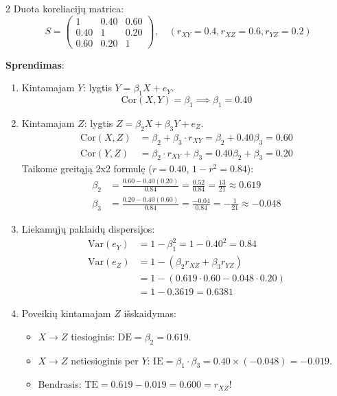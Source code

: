 \documentclass[9pt,a4paper]{article}
\begin{document}
\begin{multicols*}{2}
Duota koreliacijų matrica:
\begin{equation*}
    S = \begin{pmatrix} 1 & 0.40 & 0.60 \\ 0.40 & 1 & 0.20 \\ 0.60 & 0.20 & 1 \end{pmatrix}, \quad (r_{XY}=0.4, r_{XZ}=0.6, r_{YZ}=0.2)
\end{equation*}

\textbf{Sprendimas}:
\begin{enumerate}
    \item Kintamajam $Y$: lygtis $Y = \beta_1 X + e_Y$.
    \begin{equation*}
        \text{Cor}(X, Y) = \beta_1 \implies \beta_1 = 0.40
    \end{equation*}
    \item Kintamajam $Z$: lygtis $Z = \beta_2 X + \beta_3 Y + e_Z$.
    \begin{align*}
        \text{Cor}(X, Z) &= \beta_2 + \beta_3 \cdot r_{XY} = \beta_2 + 0.40 \beta_3 = 0.60 \\
        \text{Cor}(Y, Z) &= \beta_2 \cdot r_{XY} + \beta_3 = 0.40 \beta_2 + \beta_3 = 0.20
    \end{align*}
    Taikome greitąją 2x2 formulę ($r = 0.40$, $1 - r^2 = 0.84$):
    \begin{align*}
        \beta_2 &= \frac{0.60 - 0.40(0.20)}{0.84} = \frac{0.52}{0.84} = \frac{13}{21} \approx 0.619 \\
        \beta_3 &= \frac{0.20 - 0.40(0.60)}{0.84} = \frac{-0.04}{0.84} = -\frac{1}{21} \approx -0.048
    \end{align*}
    \item Liekamųjų paklaidų dispersijos:
    \begin{align*}
        \text{Var}(e_Y) &= 1 - \beta_1^2 = 1 - 0.40^2 = 0.84 \\
        \text{Var}(e_Z) &= 1 - (\beta_2 r_{XZ} + \beta_3 r_{YZ}) \\
        &= 1 - (0.619 \cdot 0.60 - 0.048 \cdot 0.20) \\
        &= 1 - 0.3619 = 0.6381
    \end{align*}
    \item Poveikių kintamajam $Z$ išskaidymas:
    \begin{itemize}
        \item $X \to Z$ tiesioginis: $\text{DE} = \beta_2 = 0.619$.
        \item $X \to Z$ netiesioginis per $Y$: $\text{IE} = \beta_1 \cdot \beta_3 = 0.40 \times (-0.048) = -0.019$.
        \item Bendrasis: $\text{TE} = 0.619 - 0.019 = 0.600 = r_{XZ}$!
    \end{itemize}
\end{enumerate}


\end{multicols*}
\end{document}
